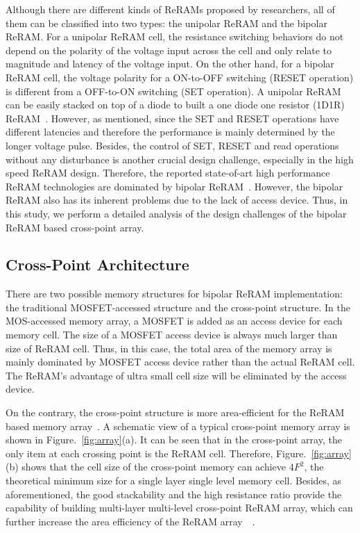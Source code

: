 Although there are different kinds of ReRAMs proposed by researchers, all of them can be classified into two types: the unipolar ReRAM and the bipolar ReRAM. For a unipolar ReRAM cell, the resistance switching behaviors do not depend on the polarity of the voltage input across the cell and only relate to magnitude and latency of the voltage input. On the other hand, for a bipolar ReRAM cell, the voltage polarity for a ON-to-OFF switching (RESET operation) is different from a OFF-to-ON switching (SET operation). A unipolar ReRAM can be easily stacked on top of a diode to built a one diode one resistor (1D1R) ReRAM~\cite{memristor:1D1R}. However, as mentioned, since the SET and RESET operations have different latencies and therefore the performance is mainly determined by the longer voltage pulse. Besides, the control of SET, RESET and read operations without any disturbance is another crucial design challenge, especially in the high speed ReRAM design. Therefore, the reported state-of-art high performance ReRAM technologies are dominated by bipolar ReRAM~\cite{ReRAM_IEDM2010_Kim,ReRAM_ISSCC2011_Sheu,ReRAM_ISSCC2011_Otsuka}. However, the bipolar ReRAM also has its inherent problems due to the lack of access device. Thus, in this study, we perform a detailed analysis of the design challenges of the bipolar ReRAM based cross-point array.

\subsection{Cross-Point Architecture}
There are two possible memory structures for bipolar ReRAM implementation: the traditional MOSFET-accessed structure and the cross-point structure. In the MOS-accessed memory array, a MOSFET is added as an access device for each memory cell. The size of a MOSFET access device is always much larger than size of ReRAM cell. Thus, in this case, the total area of the memory array is mainly dominated by MOSFET access device rather than the actual ReRAM cell. The ReRAM's advantage of ultra small cell size will be eliminated by the access device.

On the contrary, the cross-point structure is more area-efficient for the ReRAM based memory array~\cite{memristor:Cong}. A schematic view of a typical cross-point memory array is shown in Figure.~\ref{fig:array}(a). It can be seen that in the cross-point array, the only item at each crossing point is the ReRAM cell. Therefore, Figure.~\ref{fig:array}(b) shows that the cell size of the cross-point memory can achieve $4F^2$, the theoretical minimum size for a single layer single level memory cell. Besides, as aforementioned, the good stackability and the high resistance ratio provide the capability of building multi-layer multi-level cross-point ReRAM array, which can further increase the area efficiency of the ReRAM array~\cite{ReRAM_ISSCC2011_Sheu}~\cite{memristor:IEDM08_3D}.

